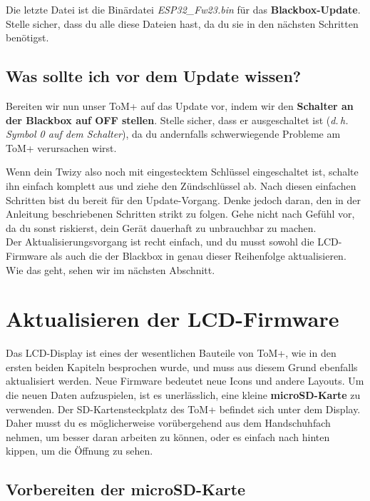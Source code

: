 Die letzte Datei ist die Binärdatei \textit{ESP32\_Fw23.bin} für das \textbf{Blackbox-Update}. Stelle sicher, dass du alle diese Dateien hast, da du sie in den nächsten Schritten benötigst.

\subsection{Was sollte ich vor dem Update wissen?}

Bereiten wir nun unser ToM+ auf das Update vor, indem wir den \textbf{Schalter an der Blackbox auf OFF stellen}. Stelle sicher, dass er ausgeschaltet ist (\textit{d.\,h. Symbol 0 auf dem Schalter}), da du andernfalls schwerwiegende Probleme am ToM+ verursachen wirst.

Wenn dein Twizy also noch mit eingestecktem Schlüssel eingeschaltet ist, schalte ihn einfach komplett aus und ziehe den Zündschlüssel ab. Nach diesen einfachen Schritten bist du bereit für den Update-Vorgang. Denke jedoch daran, den in der Anleitung beschriebenen Schritten strikt zu folgen. Gehe nicht nach Gefühl vor, da du sonst riskierst, dein Gerät dauerhaft zu unbrauchbar zu machen.\\

Der Aktualisierungsvorgang ist recht einfach, und du musst sowohl die LCD-Firmware als auch die der Blackbox in genau dieser Reihenfolge aktualisieren. Wie das geht, sehen wir im nächsten Abschnitt.



\section{Aktualisieren der LCD-Firmware}

Das LCD-Display ist eines der wesentlichen Bauteile von ToM+, wie in den ersten beiden Kapiteln besprochen wurde, und muss aus diesem Grund ebenfalls aktualisiert werden. Neue Firmware bedeutet neue Icons und andere Layouts. Um die neuen Daten aufzuspielen, ist es unerlässlich, eine kleine \textbf{microSD-Karte} zu verwenden. Der SD-Kartensteckplatz des ToM+ befindet sich unter dem Display. Daher musst du es möglicherweise vorübergehend aus dem Handschuhfach nehmen, um besser daran arbeiten zu können, oder es einfach nach hinten kippen, um die Öffnung zu sehen.

\subsection{Vorbereiten der microSD-Karte}

